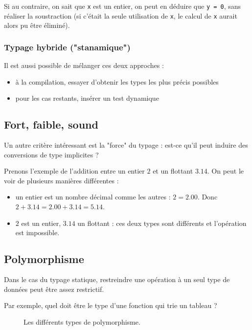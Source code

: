 Si au contraire, on sait que \texttt{x} est un entier, on peut en déduire que
\texttt{y = 0}, sans réaliser la soustraction (si c'était la seule utilisation
de \texttt{x}, le calcul de \texttt{x} aurait alors pu être éliminé).

\subsubsection{Typage hybride ("stanamique")}

Il est aussi possible de mélanger ces deux approches :

\begin{itemize}
\item
  à la compilation, essayer d'obtenir les types les plus précis
  possibles
\item
  pour les cas restants, insérer un test dynamique
\end{itemize}

\subsection{Fort, faible, sound}

Un autre critère intéressant est la "force" du typage : est-ce qu'il peut
induire des conversions de type implicites ?

Prenons l'exemple de l'addition entre un entier $2$ et un flottant $3.14$. On
peut le voir de plusieurs manières différentes :

\begin{itemize}
\item
  un entier est un nombre décimal comme les autres : $2 = 2.00$. Donc
  $2 + 3.14 = 2.00 + 3.14 = 5.14$.
\item
  $2$ est un entier, $3.14$ un flottant : ces deux types sont différents et
  l'opération est impossible.
\end{itemize}

\subsection{Polymorphisme}

Dans le cas du typage statique, restreindre une opération à un seul type de
données peut être assez restrictif.

Par exemple, quel doit être le type d'une fonction qui trie un tableau ?

\begin{figure}

\caption{Les différents types de polymorphisme.}
\label{fig:types-de-polymorphisme}
\end{figure}

